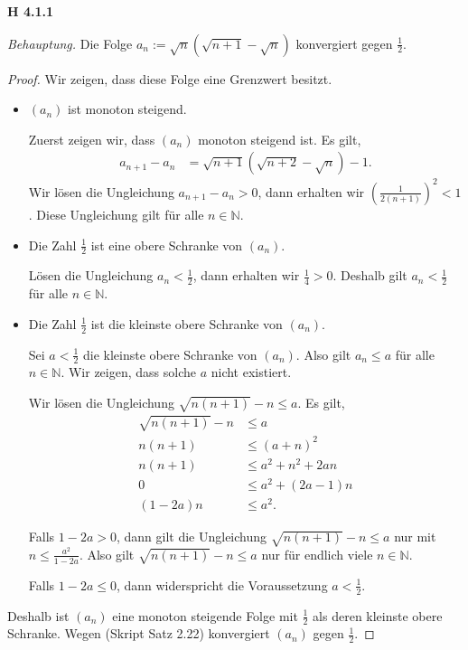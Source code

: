 \documentclass[12pt]{extarticle}
\begin{document}
\textbf{H 4.1.1}

\textit{Behauptung.}   Die Folge $a_n:= \sqrt{n}(\sqrt{n+1} -
\sqrt{n})$ konvergiert gegen \(\frac{1}{2}\).


\begin{proof}

  Wir zeigen, dass diese Folge eine Grenzwert besitzt.
  \begin{itemize}
  \item \((a_n)\) ist monoton steigend.

  Zuerst zeigen wir, dass \((a_n)\) monoton steigend ist.  Es gilt,
\begin{align*}
a_{n+1} - a_n &= \sqrt{n+1}(\sqrt{n+2}-\sqrt{n}) - 1.
\end{align*}
Wir lösen die Ungleichung \(a_{n+1} - a_n > 0\), dann erhalten wir
\(\left( \frac{1}{2(n+1)} \right)^2 < 1\).  Diese Ungleichung gilt für
alle \(n \in \mathbb{N}\).
\item Die Zahl \(\frac{1}{2}\) ist eine obere Schranke von \((a_n)\).

  Lösen die Ungleichung \(a_n < \frac{1}{2}\), dann erhalten wir
  \(\frac{1}{4} > 0\).  Deshalb  gilt \(a_n < \frac{1}{2}\) für alle $n
  \in \mathbb{N}$.
\item Die Zahl \(\frac{1}{2}\) ist die kleinste obere Schranke von
  \((a_n)\).

  Sei \(a < \frac{1}{2}\) die kleinste obere Schranke von \((a_n)\).  Also
  gilt \(a_n \leq a\) für alle \(n \in \mathbb{N}\).  Wir zeigen, dass
  solche \(a\) nicht existiert.

  Wir lösen die Ungleichung \(\sqrt{n(n+1)} - n \leq a\).  Es gilt,
\begin{align*}
  \sqrt{n(n+1)} - n &\leq a\\
  n(n+1) &\leq (a+n)^2 \\
  n(n+1) &\leq a^2+n^2+2an\\
  0 &\leq a^2 + (2a -1)n\\
  (1-2a)n &\leq a^2.
\end{align*}

Falls \(1-2a > 0\), dann gilt die Ungleichung \(\sqrt{n(n+1)} - n \leq a\)
nur mit \(n \leq \frac{a^2}{1-2a}\).  Also gilt
\(\sqrt{n(n+1)} - n \leq a\) nur für endlich viele \(n \in \mathbb{N}\).

Falls \(1-2a \leq 0\), dann widerspricht die Voraussetzung $a <
\frac{1}{2}$.

  \end{itemize}

Deshalb ist \((a_n)\) eine monoton steigende Folge mit \(\frac{1}{2}\) als
deren kleinste obere Schranke.  Wegen (Skript Satz 2.22) konvergiert
\((a_n)\) gegen \(\frac{1}{2}\).
\end{proof}
\end{document}
